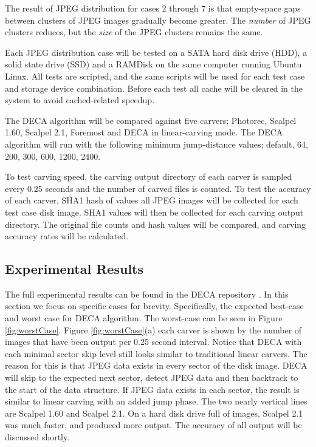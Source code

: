 \documentclass[final,5p,times,twocolumn,authoryear]{elsarticle}
\begin{document}
The result of JPEG distribution for cases 2 through 7 is that empty-space gaps between clusters of JPEG images gradually become greater. The \emph{number} of JPEG clusters reduces, but the \emph{size} of the JPEG clusters remains the same.

Each JPEG distribution case will be tested on a SATA hard disk drive (HDD), a solid state drive (SSD) and a RAMDisk on the same computer running Ubuntu Linux. All tests are scripted, and the same scripts will be used for each test case and storage device combination. Before each test all cache will be cleared in the system to avoid cached-related speedup.

The DECA algorithm will be compared against five carvers; Photorec, Scalpel 1.60, Scalpel 2.1, Foremost and DECA in linear-carving mode. The DECA algorithm will run with the following minimum jump-distance values; default, 64, 200, 300, 600, 1200, 2400.

To test carving speed, the carving output directory of each carver is sampled every 0.25 seconds and the number of carved files is counted. To test the accuracy of each carver, SHA1 hash of values all JPEG images will be collected for each test case disk image. SHA1 values will then be collected for each carving output directory. The original file counts and hash values will be compared, and carving accuracy rates will be calculated.

\subsection{Experimental Results}
The full experimental results can be found in the DECA repository \cite{gladyshevjames2015}. In this section we focus on specific cases for brevity. Specifically, the expected best-case and worst case for DECA algorithm. The worst-case can be seen in Figure \ref{fig:worstCase}. Figure \ref{fig:worstCase}(a) each carver is shown by the number of images that have been output per 0.25 second interval. Notice that DECA with each minimal sector skip level still looks similar to traditional linear carvers. The reason for this is that JPEG data exists in every sector of the disk image. DECA will skip to the expected next sector, detect JPEG data and then backtrack to the start of the data structure. If JPEG data exists in each sector, the result is similar to linear carving with an added jump phase. The two nearly vertical lines are Scalpel 1.60 and Scalpel 2.1. On a hard disk drive full of images, Scalpel 2.1 was much faster, and produced more output. The accuracy of all output will be discussed shortly.
\end{document}
